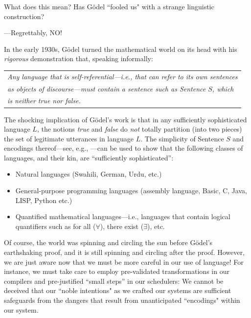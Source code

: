 \noindent
What does this mean?  Has G\"{o}del ``fooled us" with a strange linguistic construction?

\smallskip

\noindent
---Regrettably, NO!

\medskip

\noindent
In the early 1930s, G\"{o}del turned the mathematical world on its head with his {\em rigorous }demonstration that, speaking informally:

\smallskip

\begin{tabular}{l}
{\em Any language that is {\em self-referential}---i.e., that can refer to its own sentences} \\
{\em as objects of discourse---must contain a sentence such as Sentence $S$, which} \\
{\em is neither true nor false.}  \cite{Goedel31}
\end{tabular}

\bigskip

The shocking implication of G\"{o}del's work is that in any sufficiently sophisticated language $L$, the notions {\it true} and {\it false} do {\em not} totally partition (into two pieces) the set of legitimate utterances in language $L$.  The simplicity of Sentence $S$ and encodings thereof---see, e.g., \cite{Rosenberg09}---can be used to show that the following classes of languages, and their kin, are
``sufficiently sophisticated'':
\begin{itemize}
\item
Natural languages (Swahili, German, Urdu, etc.)
\item
General-purpose programming languages (assembly language, Basic, C, Java, LISP, Python etc.)
\item
Quantified mathematical languages---i.e., languages that contain logical quantifiers such as {\sc for all} ($\forall$), {\sc there exist} ($\exists$), etc.
\end{itemize}

Of course, the world was spinning and circling the sun before G\"{o}del's earthshaking proof, and it is still spinning and circling after the proof.  However, we are just aware now that we must be more careful in our use of language!  For instance, we must take care to employ pre-validated transformations in our compilers and pre-justified ``small steps'' in our schedulers: We cannot be deceived that our ``noble intentions" as we crafted our systems are sufficient safeguards from the dangers that result from unanticipated ``encodings" within our system.


